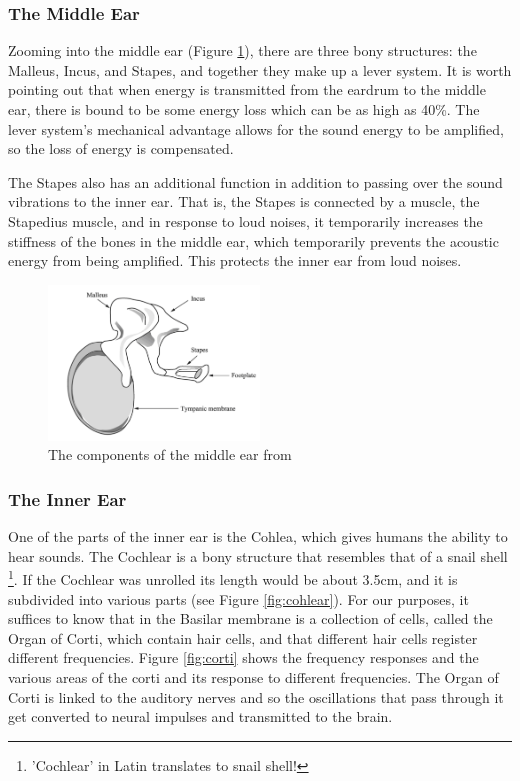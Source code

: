 \documentclass[logo,bsc,singlespacing,parskip,online]{infthesis}
\begin{document}
\subsubsection{The Middle Ear}
Zooming into the middle ear (Figure \ref{fig:middle-ear}), there are three bony structures: the Malleus, Incus, and Stapes,
and together they make up a lever system. 
It is worth pointing out that when energy is transmitted from the eardrum to the middle ear, there is bound to be some energy loss which can be as high as 40\%. The lever system's mechanical advantage 
allows for the sound energy to be amplified, so the loss of energy is compensated. 

The Stapes also has an additional function in addition to passing over the sound vibrations to the inner ear. That is,
the Stapes is connected by a muscle, the Stapedius muscle, and in response to loud noises, it temporarily increases the stiffness of the bones in the middle ear, which temporarily prevents the acoustic energy from being amplified. This 
protects the inner ear from loud noises.

\begin{figure}[h]
   \centering
   \includegraphics[width=0.5\textwidth]{wayland-middle-ear.png}
   \caption{The components of the middle ear from \citet{Wayland2018Phonetics}}
   \label{fig:middle-ear}
\end{figure}

\subsubsection{The Inner Ear}
One of the parts of the inner ear is the Cohlea, which gives humans the ability to hear sounds.
The Cochlear is a bony structure that resembles that of a snail shell \footnote{'Cochlear' in Latin translates to snail shell!}.
If the Cochlear was unrolled its length would be about 3.5cm, and it is subdivided into various parts (see Figure \ref{fig:cohlear}).
For our purposes, it suffices to know that in the Basilar membrane is a collection of cells, called 
the Organ of Corti, which contain hair cells, and that different hair cells register different frequencies.
Figure \ref{fig:corti} shows the frequency responses and the various areas of the corti 
and its response to different frequencies. The Organ of Corti is linked to the auditory nerves and 
so the oscillations that pass through it get converted to neural impulses and transmitted to the brain.
\end{document}
